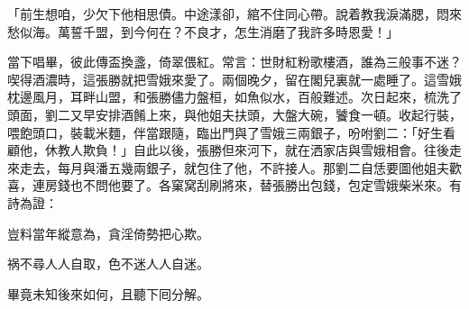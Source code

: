 \begin{myquote}
「前生想咱，少欠下他相思債。中途漾卻，綰不住同心帶。說着教我淚滿腮，悶來愁似海。萬誓千盟，到今何在？不良才，怎生消磨了我許多時恩愛！」
\end{myquote}

當下唱畢，彼此傳盃換盞，倚翠偎紅。常言：世財紅粉歌樓酒，誰為三般事不迷？喫得酒濃時，這張勝就把雪娥來愛了。兩個晚夕，留在閣兒裏就一處睡了。這雪娥枕邊風月，耳畔山盟，和張勝儘力盤桓，如魚似水，百般難述。次日起來，梳洗了頭面，劉二又早安排酒餚上來，與他姐夫扶頭，大盤大碗，饕食一頓。收起行裝，喂飽頭口，裝載米麵，伴當跟隨，臨出門與了雪娥三兩銀子，吩咐劉二：「好生看顧他，休教人欺負！」自此以後，張勝但來河下，就在洒家店與雪娥相會。往後走來走去，每月與潘五幾兩銀子，就包住了他，不許接人。那劉二自恁要圖他姐夫歡喜，連房錢也不問他要了。各窠窝刮刷將來，替張勝出包錢，包定雪娥柴米來。有詩為證：

\begin{myquote}
豈料當年縱意為，貪淫倚勢把心欺。

祸不尋人人自取，色不迷人人自迷。
\end{myquote}

畢竟未知後來如何，且聽下囘分解。

